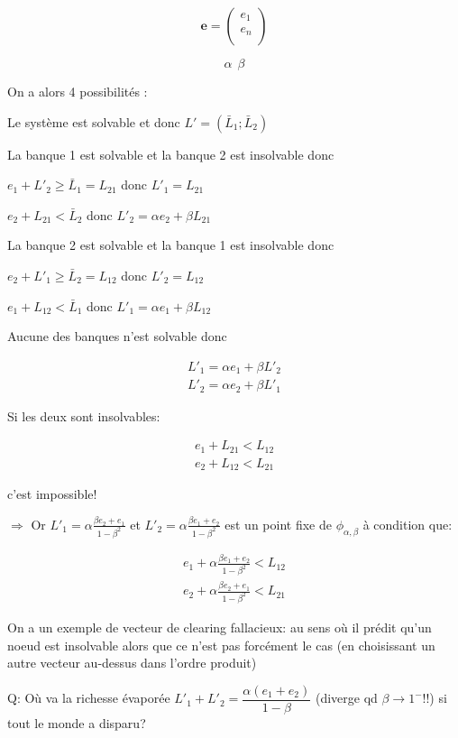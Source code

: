 \documentclass{article}
\def\AR#1{
\[
\begin{array}{llllllll}
#1
\end{array}
\]
}
\begin{document}
\begin{equation*}
\textbf{e} = 
\begin{pmatrix}
e_{1} \\
e_{n} \\
\end{pmatrix}
\end{equation*}

\begin{equation*}
\alpha    \
\
\beta
\end{equation*}

On a alors 4 possibilités :

Le système est solvable et donc $L' = (\bar{L}_{1} ; \bar{L}_{2})$

La banque 1 est solvable et la banque 2 est insolvable donc 
\begin{center}
$e_{1} + L'_{2} \geq \bar{L}_{1} = L_{21}$ donc $L'_{1} = L_{21}$

$e_{2} + L_{21} < \bar{L}_{2}$ donc $L'_{2} = \alpha e_{2} + \beta L_{21}$
\end{center}

La banque 2 est solvable et la banque 1 est insolvable donc 
\begin{center}
$e_{2} + L'_{1} \geq \bar{L}_{2} = L_{12}$ donc $L'_{2} = L_{12}$

$e_{1} + L_{12} < \bar{L}_{1}$ donc $L'_{1} = \alpha e_{1} + \beta L_{12}$
\end{center}

Aucune des banques n'est solvable donc
\AR{
L'_{1} = \alpha e_{1} + \beta L'_{2} 
\\
L'_{2} = \alpha e_{2} + \beta L'_{1}
}

Si les deux sont insolvables:
\AR{
e_{1} + L_{21} < L_{12}
\\
e_{2} + L_{12} < L_{21}
}
c'est impossible!

$\Longrightarrow$ Or $L'_{1} = \alpha \frac{\beta e_{2} + e_{1}}{1- \beta^{2}} $ et $L'_{2} = \alpha \frac{\beta e_{1} + e_{2}}{1 - \beta^{2}}$
est un point fixe de $\phi_{\alpha,\beta}$ à condition que:
\AR{
 e_1 +
 \alpha \frac{\beta e_{1} + e_{2}}{1 - \beta^{2}}
 < L_{12}
\\
 e_2 +
 \alpha \frac{\beta e_{2} + e_{1}}{1 - \beta^{2}}
 < L_{21}
 }

On a un exemple de vecteur de clearing fallacieux: au sens où il prédit qu'un noeud est insolvable alors que ce n'est pas forcément le cas (en choisissant un autre vecteur au-dessus dans l'ordre produit)

Q: Où va la richesse évaporée 
$L'_1+L'_2= \dfrac{\alpha(e_1+e_2)}{1-\beta}$ (diverge qd $\beta\to 1^-$!!)
si tout le monde a disparu?
\end{document}

